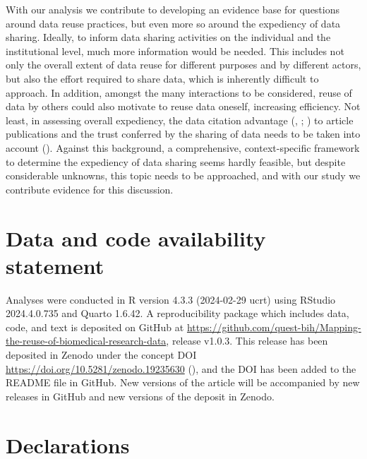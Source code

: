 \documentclass[
  letterpaper,
  DIV=11,
  numbers=noendperiod]{scrartcl}
\begin{document}
With our analysis we contribute to developing an evidence base for
questions around data reuse practices, but even more so around the
expediency of data sharing. Ideally, to inform data sharing activities
on the individual and the institutional level, much more information
would be needed. This includes not only the overall extent of data reuse
for different purposes and by different actors, but also the effort
required to share data, which is inherently difficult to approach. In
addition, amongst the many interactions to be considered, reuse of data
by others could also motivate to reuse data oneself, increasing
efficiency. Not least, in assessing overall expediency, the data
citation advantage
(, ;
) to
article publications and the trust conferred by the sharing of data
needs to be taken into account
(). Against
this background, a comprehensive, context-specific framework to
determine the expediency of data sharing seems hardly feasible, but
despite considerable unknowns, this topic needs to be approached, and
with our study we contribute evidence for this discussion.

\section{Data and code availability
statement}\label{data-and-code-availability-statement}

Analyses were conducted in R version 4.3.3 (2024-02-29 ucrt) using
RStudio 2024.4.0.735 and Quarto 1.6.42. A reproducibility package which
includes data, code, and text is deposited on GitHub at
\url{https://github.com/quest-bih/Mapping-the-reuse-of-biomedical-research-data},
release v1.0.3. This release has been deposited in Zenodo under the
concept DOI \url{https://doi.org/10.5281/zenodo.19235630}
(), and
the DOI has been added to the README file in GitHub. New versions of the
article will be accompanied by new releases in GitHub and new versions
of the deposit in Zenodo.

\section{Declarations}\label{declarations}
\end{document}
